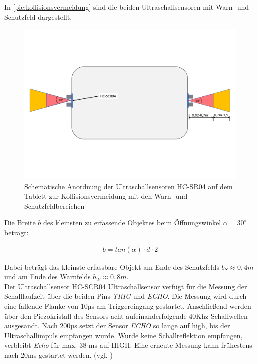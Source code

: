 In \autoref{pic:kollisionsvermeidung} sind die beiden Ultraschallsensoren mit Warn- und Schutzfeld dargestellt. 

\begin{figure}[h]
	\begin{center}
		\includegraphics[width=16cm]{kollisionsvermeidung.pdf}
		\caption{Schematische Anordnung der Ultraschallsensoren HC-SR04 auf dem Tablett zur Kollisionsvermeidung mit den Warn- und Schutzfeldbereichen}
		\label{pic:kollisionsvermeidung}
	\end{center}
\end{figure}
\newpage

Die Breite $b$ des kleinsten zu erfassende Objektes beim Öffnungswinkel $\alpha = 30^{\circ}$ beträgt:

\begin{align}
	b= tan(\alpha) \cdot d \cdot 2
\end{align}

 Dabei beträgt das kleinste erfassbare Objekt am Ende des Schutzfelds $b_S \approx 0,4m$ und am Ende des Warnfelds $b_W \approx 0,8m$. \\
 
Der Ultraschallsensor HC-SCR04 Ultraschallsensor verfügt für die Messung der Schalllaufzeit über die beiden Pins \textit{TRIG} und \textit{ECHO}. Die Messung wird durch eine fallende Flanke von 10µs am Triggereingang gestartet. Anschließend werden über den  Piezokristall des Sensors acht aufeinanderfolgende 40Khz Schallwellen ausgesandt. Nach 200µs setzt der Sensor \textit{ECHO} so lange auf high, bis der Ultraschallimpuls empfangen wurde. Wurde keine Schallreflektion empfangen, verbleibt  \textit{Echo} für max. 38 ms auf HIGH. Eine erneute Messung kann frühestens nach 20ms gestartet werden. (vgl. \cite{hcrs04})

